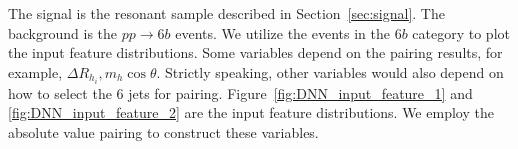 \documentclass[12pt]{article}
\begin{document}
        The signal is the resonant sample described in Section~\ref{sec:signal}. The background is the $pp\to 6b$ events. We utilize the events in the $6b$ category to plot the input feature distributions. Some variables depend on the pairing results, for example, $\Delta R_{h_i}, m_h\cos\theta$. Strictly speaking, other variables would also depend on how to select the 6 jets for pairing. Figure~\ref{fig:DNN_input_feature_1} and \ref{fig:DNN_input_feature_2} are the input feature distributions. We employ the absolute value pairing to construct these variables.
        \begin{figure}[htpb]
            \centering
              \\
             \\

\end{figure}
\end{document}
